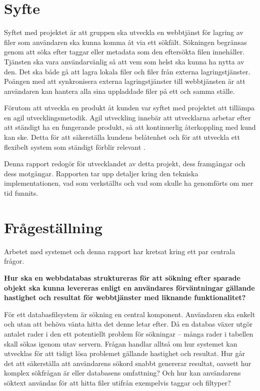 \section{Syfte}
Syftet med projektet är att gruppen ska utveckla en webbtjänst för lagring av filer som användaren ska kunna komma åt via ett sökfält. Sökningen begränsas genom att söka efter taggar eller metadata som den eftersökta filen innehåller. Tjänsten ska vara användarvänlig så att vem som helst ska kunna ha nytta av den. Det ska både gå att lagra lokala filer och filer från externa lagringstjänster. Poängen med att synkronisera externa lagringstjänster till webbtjänsten är att användaren kan hantera alla sina uppladdade filer på ett och samma ställe.

Förutom att utveckla en produkt åt kunden var syftet med projektet att tillämpa en agil utvecklingsmetodik. Agil utveckling innebär att utvecklarna arbetar efter att ständigt ha en fungerande produkt, så att kontinuerlig återkoppling med kund kan ske. Detta för att säkerställa kundens belåtenhet och för att utveckla ett flexibelt system som ständigt förblir relevant \cite{softwareeng}.

Denna rapport redogör för utvecklandet av detta projekt, dess framgångar och dess motgångar. Rapporten tar upp detaljer kring den tekniska implementationen, vad som verkställts och vad som skulle ha genomförts om mer tid funnits. 

\section{Frågeställning}
Arbetet med systemet och denna rapport har kretsat kring ett par centrala frågor.

\textbf{Hur ska en webbdatabas struktureras för att sökning efter sparade objekt ska kunna levereras enligt en användares förväntningar gällande hastighet och resultat för webbtjänster med liknande funktionalitet?}

För ett databasfilsystem är sökning en central komponent. Användaren ska enkelt och utan att behöva vänta hitta det denne letar efter. Då en databas växer utgör antalet rader i den ett potentiellt problem för sökningar – många rader i tabellen skall sökas igenom utav servern. Frågan handlar alltså om hur systemet kan utvecklas för att tidigt lösa problemet gällande hastighet och resultat. Hur går det att säkerställa att användarens sökord snabbt genererar resultat, oavsett hur komplex sökfrågan är eller databasens omfattning? Och hur kan användarens söktext användas för att hitta filer utifrån exempelvis taggar och filtyper?

